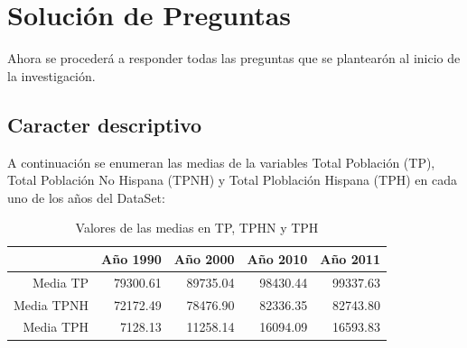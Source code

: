 \section{Solución de Preguntas}
Ahora se procederá a responder todas las preguntas que se plantearón al inicio de la investigación.



\subsection{Caracter descriptivo}


A continuación se enumeran las medias de la variables Total Población (TP), Total Población  No Hispana (TPNH) y Total Ploblación Hispana (TPH) en cada uno de los años del DataSet:

\begin{table}[ht]
\centering
\begin{tabular}{rrrrr}
  \hline
 & Año 1990 & Año 2000 & Año 2010 & Año 2011 \\ 
  \hline
Media TP & 79300.61 & 89735.04 & 98430.44 & 99337.63 \\ 
  Media TPNH & 72172.49 & 78476.90 & 82336.35 & 82743.80 \\ 
  Media TPH & 7128.13 & 11258.14 & 16094.09 & 16593.83 \\ 
   \hline
\end{tabular}
\caption{Valores de las medias en TP, TPHN y TPH} 
\end{table}





